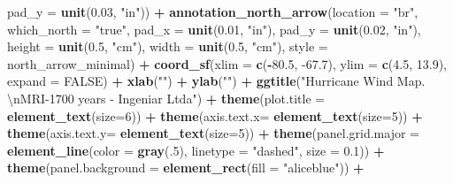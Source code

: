 \documentclass[12pt,twoside]{reedthesis}
\newenvironment{Shaded}{\begin{snugshade}}{\end{snugshade}}
\newcommand{\CharTok}[1]{\textcolor[rgb]{0.31,0.60,0.02}{#1}}
\newcommand{\DataTypeTok}[1]{\textcolor[rgb]{0.13,0.29,0.53}{#1}}
\newcommand{\DecValTok}[1]{\textcolor[rgb]{0.00,0.00,0.81}{#1}}
\newcommand{\FloatTok}[1]{\textcolor[rgb]{0.00,0.00,0.81}{#1}}
\newcommand{\KeywordTok}[1]{\textcolor[rgb]{0.13,0.29,0.53}{\textbf{#1}}}
\newcommand{\NormalTok}[1]{#1}
\newcommand{\OperatorTok}[1]{\textcolor[rgb]{0.81,0.36,0.00}{\textbf{#1}}}
\newcommand{\OtherTok}[1]{\textcolor[rgb]{0.56,0.35,0.01}{#1}}
\newcommand{\StringTok}[1]{\textcolor[rgb]{0.31,0.60,0.02}{#1}}
\begin{document}
\begin{Shaded}
\begin{Highlighting}[]
   \DataTypeTok{pad_y =} \KeywordTok{unit}\NormalTok{(}\FloatTok{0.03}\NormalTok{, }\StringTok{"in"}\NormalTok{)) }\OperatorTok{+}\StringTok{ }
\StringTok{  }\KeywordTok{annotation_north_arrow}\NormalTok{(}\DataTypeTok{location =} \StringTok{"br"}\NormalTok{, }\DataTypeTok{which_north =} \StringTok{"true"}\NormalTok{, }\DataTypeTok{pad_x =} \KeywordTok{unit}\NormalTok{(}\FloatTok{0.01}\NormalTok{, }\StringTok{"in"}\NormalTok{), }\DataTypeTok{pad_y =} \KeywordTok{unit}\NormalTok{(}\FloatTok{0.02}\NormalTok{, }\StringTok{"in"}\NormalTok{), }\DataTypeTok{height =} \KeywordTok{unit}\NormalTok{(}\FloatTok{0.5}\NormalTok{, }\StringTok{"cm"}\NormalTok{), }
   \DataTypeTok{width =} \KeywordTok{unit}\NormalTok{(}\FloatTok{0.5}\NormalTok{, }\StringTok{"cm"}\NormalTok{), }\DataTypeTok{style =}\NormalTok{ north_arrow_minimal) }\OperatorTok{+}
\StringTok{  }\KeywordTok{coord_sf}\NormalTok{(}\DataTypeTok{xlim =} \KeywordTok{c}\NormalTok{(}\OperatorTok{-}\FloatTok{80.5}\NormalTok{, }\FloatTok{-67.7}\NormalTok{), }\DataTypeTok{ylim =} \KeywordTok{c}\NormalTok{(}\FloatTok{4.5}\NormalTok{, }\FloatTok{13.9}\NormalTok{), }\DataTypeTok{expand =} \OtherTok{FALSE}\NormalTok{) }\OperatorTok{+}
\StringTok{  }\KeywordTok{xlab}\NormalTok{(}\StringTok{""}\NormalTok{) }\OperatorTok{+}\StringTok{ }
\StringTok{  }\KeywordTok{ylab}\NormalTok{(}\StringTok{""}\NormalTok{) }\OperatorTok{+}\StringTok{ }
\StringTok{  }\KeywordTok{ggtitle}\NormalTok{(}\StringTok{"Hurricane Wind Map. }\CharTok{\textbackslash{}n}\StringTok{MRI-1700 years - Ingeniar Ltda"}\NormalTok{) }\OperatorTok{+}\StringTok{ }
\StringTok{  }\KeywordTok{theme}\NormalTok{(}\DataTypeTok{plot.title =} \KeywordTok{element_text}\NormalTok{(}\DataTypeTok{size=}\DecValTok{6}\NormalTok{)) }\OperatorTok{+}
\StringTok{  }\KeywordTok{theme}\NormalTok{(}\DataTypeTok{axis.text.x=} \KeywordTok{element_text}\NormalTok{(}\DataTypeTok{size=}\DecValTok{5}\NormalTok{)) }\OperatorTok{+}\StringTok{ }
\StringTok{  }\KeywordTok{theme}\NormalTok{(}\DataTypeTok{axis.text.y=} \KeywordTok{element_text}\NormalTok{(}\DataTypeTok{size=}\DecValTok{5}\NormalTok{)) }\OperatorTok{+}
\StringTok{  }\KeywordTok{theme}\NormalTok{(}\DataTypeTok{panel.grid.major =} \KeywordTok{element_line}\NormalTok{(}\DataTypeTok{color =} \KeywordTok{gray}\NormalTok{(.}\DecValTok{5}\NormalTok{), }\DataTypeTok{linetype =} \StringTok{"dashed"}\NormalTok{, }\DataTypeTok{size =} \FloatTok{0.1}\NormalTok{)) }\OperatorTok{+}
\StringTok{  }\KeywordTok{theme}\NormalTok{(}\DataTypeTok{panel.background =} \KeywordTok{element_rect}\NormalTok{(}\DataTypeTok{fill =} \StringTok{"aliceblue"}\NormalTok{)) }\OperatorTok{+}

\end{Highlighting}
\end{Shaded}
\end{document}
